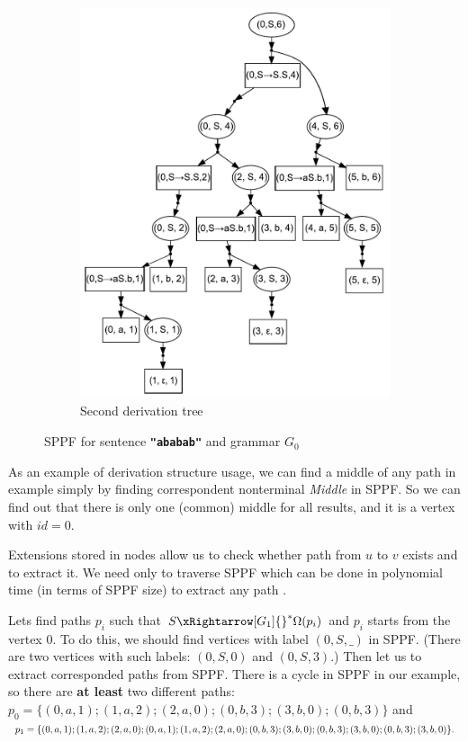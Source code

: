 \begin{figure}[ht]
\begin{center}
\begin{subfigure}[b]{0.3\textwidth}
        \includegraphics[width=\textwidth]{dot/Brackets2.pdf}
        \caption{Second derivation tree}
        \label{tree2}        
    \end{subfigure}
    \caption{SPPF for sentence \textbf{\texttt{"ababab"}} and grammar $G_0$}
    \label{sppfSample}
    \end{center}                
\end{figure}

    
As an example of derivation structure usage, we can find a middle of any path in example simply by finding correspondent nonterminal \textit{Middle} in SPPF.
So we can find out that there is only one (common) middle for all results, and it is a vertex with $id = 0$. 

Extensions stored in nodes allow us to check whether path from $u$ to $v$ exists and to extract it. 
We need only to traverse SPPF which can be done in polynomial time (in terms of SPPF size) to extract any path . 

Lets find paths $p_i$ such that $S {\xRightarrow[G_1]{}}^{*} \Omega(p_i)$ and $p_i$ starts from the vertex $0$.
To do this, we should find vertices with label $(0, S, \_)$ in SPPF.
(There are two vertices with such labels: $(0, S, 0)$ and $(0, S, 3)$.)
Then let us to extract corresponded paths from SPPF.
There is a cycle in SPPF in our example, so there are \textbf{at least} two different paths: $p_0=\{(0,a,1);(1,a,2);(2,a,0);(0,b,3);(3,b,0);(0,b,3)\}$ and 
$
p_1=\{(0,a,1);(1,a,2);(2,a,0);(0,a,1);(1,a,2);(2,a,0);(0,b,3);(3,b,0);(0,b,3);\\(3,b,0);(0,b,3);(3,b,0)\}.
$



